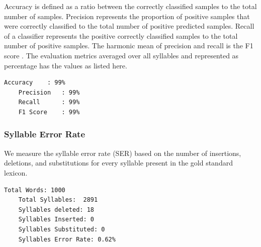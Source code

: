Accuracy is defined as a ratio between the correctly classified samples to the
total number of samples. Precision represents the proportion of positive
samples that were correctly classified to the total number of positive
predicted samples. Recall of a classifier represents the positive correctly
classified samples to the total number of positive samples. The harmonic mean
of precision and recall is the F1 score \cite{tharwat2020classification}. The
evaluation metrics averaged over all syllables and represented as percentage
has the values as listed here.


\begin{lstlisting}[basicstyle=\ttfamily]
	Accuracy	: 99%
	Precision	: 99%
	Recall		: 99%
	F1 Score	: 99%
\end{lstlisting}

\subsubsection{Syllable Error Rate}

We measure the syllable error rate (SER) based on the number of insertions,
deletions, and substitutions for every syllable present in the gold standard
lexicon.


\begin{lstlisting}[basicstyle=\ttfamily]
	Total Words: 1000
	Total Syllables:  2891
	Syllables deleted: 18
	Syllables Inserted: 0
	Syllables Substituted: 0
	Syllables Error Rate: 0.62%
\end{lstlisting}

